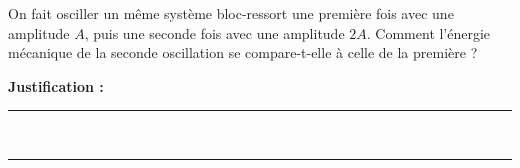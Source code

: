 On fait osciller un même système bloc-ressort une première fois avec une amplitude $A$, puis une seconde fois avec une amplitude $2A$. Comment l'énergie mécanique de la seconde oscillation se compare-t-elle à celle de la première ?

\choices

\noindent\textbf{Justification :} \hrulefill \\[2.5ex]
\rule{\linewidth}{0.4pt} \\[2.5ex]
\rule{\linewidth}{0.4pt}
\vfill
